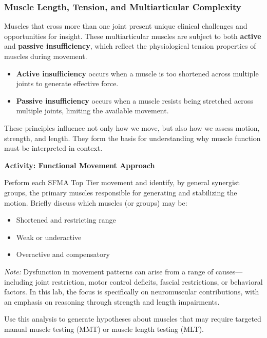 \subsubsection*{Muscle Length, Tension, and Multiarticular Complexity}

Muscles that cross more than one joint present unique clinical challenges and opportunities for insight. These multiarticular muscles are subject to both \textbf{active} and \textbf{passive insufficiency}, which reflect the physiological tension properties of muscles during movement.

\begin{itemize}
  \item \textbf{Active insufficiency} occurs when a muscle is too shortened across multiple joints to generate effective force.
  \item \textbf{Passive insufficiency} occurs when a muscle resists being stretched across multiple joints, limiting the available movement.
\end{itemize}

These principles influence not only how we move, but also how we assess motion, strength, and length. They form the basis for understanding why muscle function must be interpreted in context.

\begin{labactivitybox}
\textbf{Activity: Functional Movement Approach}

Perform each SFMA Top Tier movement and identify, by general synergist groups, the primary muscles responsible for generating and stabilizing the motion. Briefly discuss which muscles (or groups) may be:

\begin{itemize}
  \item Shortened and restricting range
  \item Weak or underactive
  \item Overactive and compensatory
\end{itemize}

\textit{Note:} Dysfunction in movement patterns can arise from a range of causes—including joint restriction, motor control deficits, fascial restrictions, or behavioral factors. In this lab, the focus is specifically on neuromuscular contributions, with an emphasis on reasoning through strength and length impairments.

Use this analysis to generate hypotheses about muscles that may require targeted manual muscle testing (MMT) or muscle length testing (MLT).
\end{labactivitybox}

